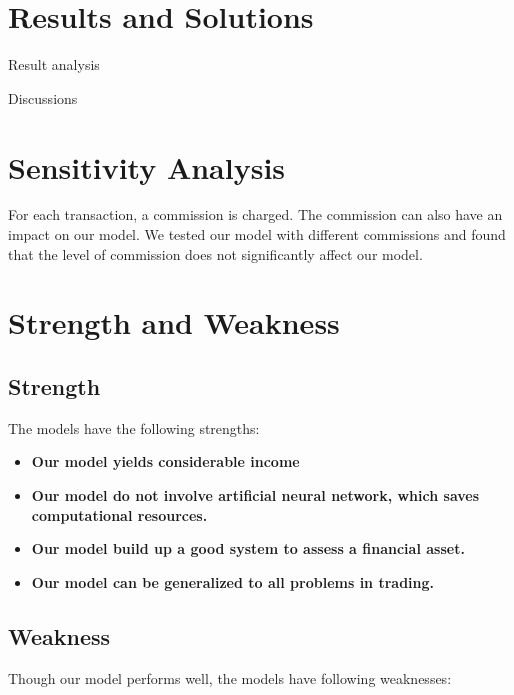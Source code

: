 \documentclass[12pt,a4paper]{article}
\begin{document}
\begin{spacing}{1.2}
\section{Results and Solutions}
\label{Results_Solutions}

Result analysis

Discussions



\section{Sensitivity Analysis}
\label{SensitivityAnalysis}

For each transaction, a commission is charged. The commission can also have an impact on our model. We tested our model with different commissions and found that the level of commission does not significantly affect our model.

\section{Strength and Weakness}
\label{Strength_Weakness}


\subsection{Strength}

The models have the following strengths:

\begin{itemize}
\item \textbf{Our model yields considerable income}

\item \textbf{Our model do not involve artificial neural network, which saves computational resources.}

\item \textbf{Our model build up a good system to assess a financial asset.}

\item \textbf{Our model can be generalized to all problems in trading.}

\end{itemize}


\subsection{Weakness}

Though our model performs well, the models have following weaknesses:


\end{spacing}
\end{document}
